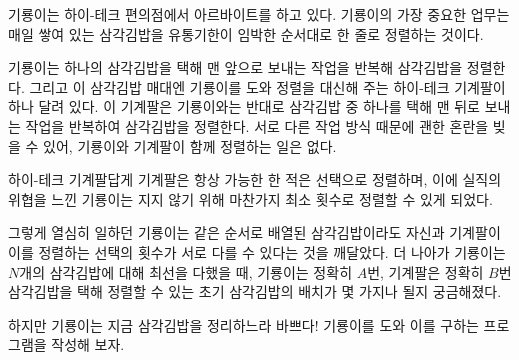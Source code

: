 기룡이는 하이-테크 편의점에서 아르바이트를 하고 있다. 
기룡이의 가장 중요한 업무는 매일 쌓여 있는 삼각김밥을 유통기한이 임박한 순서대로 한 줄로 정렬하는 것이다.

기룡이는 하나의 삼각김밥을 택해 맨 앞으로 보내는 작업을 반복해 삼각김밥을 정렬한다. 
그리고 이 삼각김밥 매대엔 기룡이를 도와 정렬을 대신해 주는 하이-테크 기계팔이 하나 달려 있다. 
이 기계팔은 기룡이와는 반대로 삼각김밥 중 하나를 택해 맨 뒤로 보내는 작업을 반복하여 삼각김밥을 정렬한다. 
서로 다른 작업 방식 때문에 괜한 혼란을 빚을 수 있어, 기룡이와 기계팔이 함께 정렬하는 일은 없다.

하이-테크 기계팔답게 기계팔은 항상 가능한 한 적은 선택으로 정렬하며, 이에 실직의 위협을 느낀 기룡이는 지지 않기 위해 마찬가지 최소 횟수로 정렬할 수 있게 되었다.

그렇게 열심히 일하던 기룡이는 같은 순서로 배열된 삼각김밥이라도 자신과 기계팔이 이를 정렬하는 선택의 횟수가 서로 다를 수 있다는 것을 깨달았다. 
더 나아가 기룡이는 $N$개의 삼각김밥에 대해 최선을 다했을 때, 기룡이는 정확히 $A$번, 기계팔은 정확히 $B$번 삼각김밥을 택해 정렬할 수 있는 초기 삼각김밥의 배치가 몇 가지나 될지 궁금해졌다. 

하지만 기룡이는 지금 삼각김밥을 정리하느라 바쁘다! 기룡이를 도와 이를 구하는 프로그램을 작성해 보자.